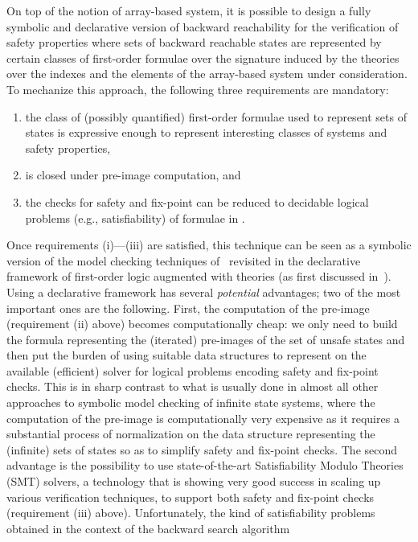\documentclass{LMCS}
\theoremstyle{plain}\newtheorem{assumption}[thm]{Assumption}
\theoremstyle{plain}\newtheorem{proposition}[thm]{Proposition}
\theoremstyle{plain}\newtheorem{property}[thm]{Property}
\theoremstyle{plain}\newtheorem{example}[thm]{Example}
\theoremstyle{plain}\newtheorem{claim}[thm]{Claim}
\theoremstyle{plain}\newtheorem{lemma}[thm]{Lemma}
\begin{document}
On top of the notion of array-based system, it is possible to design a
fully symbolic and declarative version of backward reachability for
the verification of safety properties where sets of backward reachable
states are represented by certain classes of first-order formulae over
the signature induced by the theories over the indexes and the
elements of the array-based system under consideration.  To mechanize
this approach, the following three requirements are mandatory:
\begin{enumerate}[{\rm (i)}]
\item the class  of (possibly quantified) first-order
  formulae used to represent sets of states is expressive enough to
  represent interesting classes of systems and safety properties,
\item  is closed under pre-image computation, and
\item the checks for safety and fix-point can be reduced to decidable
  logical problems (e.g., satisfiability) of formulae in
  .
\end{enumerate}
Once requirements (i)---(iii) are satisfied, this technique can be
seen as a symbolic version of the model checking techniques
of~\cite{lics} revisited in the declarative framework of first-order
logic augmented with theories (as first discussed in~\cite{ijcar08}).
Using a declarative framework has several \emph{potential} advantages;
two of the most important ones are the following.  First, the
computation of the pre-image (requirement (ii) above) becomes
computationally cheap: we only need to build the formula 
representing the (iterated) pre-images of the set of unsafe states and
then put the burden of using suitable data structures to represent
 on the available (efficient) solver for logical problems
encoding safety and fix-point checks.  This is in sharp contrast to
what is usually done in almost all other approaches to symbolic model
checking of infinite state systems, where the computation of the
pre-image is computationally very expensive as it requires a
substantial process of normalization on the data structure
representing the (infinite) sets of states so as to simplify safety
and fix-point checks.  The second advantage is the possibility to use
state-of-the-art Satisfiability Modulo Theories (SMT) solvers, a
technology that is showing very good success in scaling up various
verification techniques, to support both safety and fix-point checks
(requirement (iii) above).  Unfortunately, the kind of satisfiability
problems obtained in the context of the backward search algorithm
\end{document}
